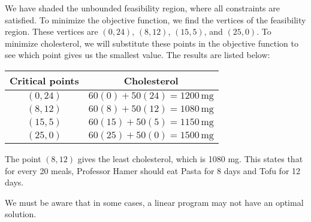 \begin{solution}

    We have shaded the unbounded feasibility region, where all constraints are satisfied. To minimize the objective function, we find the vertices of the feasibility region. These vertices are $(0, 24)$, $(8, 12)$, $(15, 5)$, and $(25, 0)$. To minimize cholesterol, we will substitute these points in the objective function to see which point gives us the smallest value. The results are listed below:
    \begin{center}
        \begin{tabular}{|c|c|}
            \hline
            Critical points & Cholesterol                          \\
            \hline
            $(0, 24)$       & $60(0) + 50(24) = 1200 \, \text{mg}$ \\
            $(8, 12)$       & $60(8) + 50(12) = 1080 \, \text{mg}$ \\
            $(15, 5)$       & $60(15) + 50(5) = 1150 \, \text{mg}$ \\
            $(25, 0)$       & $60(25) + 50(0) = 1500 \, \text{mg}$ \\
            \hline
        \end{tabular}
    \end{center}
    The point $(8, 12)$ gives the least cholesterol, which is 1080 mg. This states that for every 20 meals, Professor Hamer should eat Pasta for 8 days and Tofu for 12 days.

\end{solution}

We must be aware that in some cases, a linear program may not have an optimal solution.

